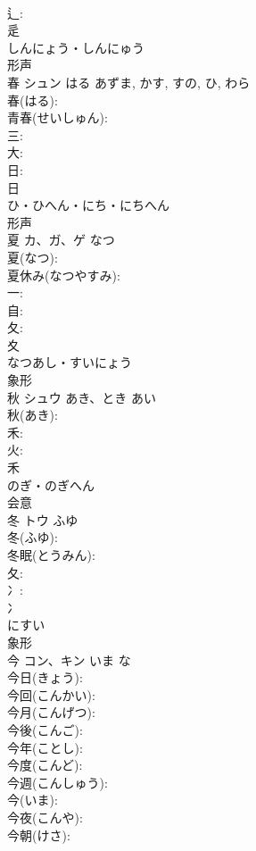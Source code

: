 \documentclass[8pt]{extreport}
\begin{document}
\begin{CJK}{UTF8}{min}
\\	辶: 
\\	辵	
\\	しんにょう・しんにゅう	
\\	形声 
\\	春	シュン	はる	あずま, かす, すの, ひ, わら	
\\	春(はる): 
\\	青春(せいしゅん): 
\\	三: 
\\	大: 
\\	日: 
\\	日	
\\	ひ・ひへん・にち・にちへん	
\\	形声 
\\	夏	カ、ガ、ゲ	なつ		
\\	夏(なつ): 
\\	夏休み(なつやすみ): 
\\	一: 
\\	自: 
\\	夂: 
\\	夊	
\\	なつあし・すいにょう	
\\	象形 
\\	秋	シュウ	あき、とき	あい	
\\	秋(あき): 
\\	禾: 
\\	火: 
\\	禾	
\\	のぎ・のぎへん	
\\	会意 
\\	冬	トウ	ふゆ		
\\	冬(ふゆ): 
\\	冬眠(とうみん): 
\\	夂: 
\\	冫: 
\\	冫	
\\	にすい	
\\	象形 
\\	今	コン、キン	いま	な	
\\	今日(きょう): 
\\	今回(こんかい): 
\\	今月(こんげつ): 
\\	今後(こんご): 
\\	今年(ことし): 
\\	今度(こんど): 
\\	今週(こんしゅう): 
\\	今(いま): 
\\	今夜(こんや): 
\\	今朝(けさ): 

\end{CJK}
\end{document}
